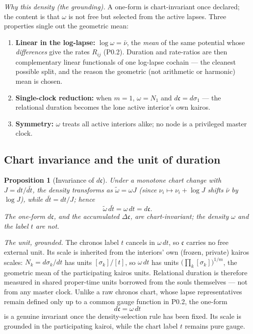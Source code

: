 \documentclass[11pt,a4paper]{article}
\theoremstyle{definition}
\theoremstyle{plain}
\newtheorem{proposition}[definition]{Proposition}
\theoremstyle{remark}
\begin{document}
\emph{Why this density (the grounding).} A one-form is chart-invariant once declared;
the content is that \(\omega\) is not free but selected from the active lapses. Three
properties single out the geometric mean:
\begin{enumerate}[label=\textup{(\arabic*)},leftmargin=1.45cm]
\item \textbf{Linear in the log-lapse:} \(\log\omega=\bar\nu\), the \emph{mean} of the
same potential whose \emph{differences} give the rates \(R_{ij}\) (P0.2). Duration and
rate-ratios are then complementary linear functionals of one log-lapse cochain ---
the cleanest possible split, and the reason the geometric (not arithmetic or harmonic)
mean is chosen.
\item \textbf{Single-clock reduction:} when \(m=1\), \(\omega=N_{1}\) and
\(d\mathfrak c=d\sigma_{1}\) --- the relational duration becomes the lone active
interior's own kairos.
\item \textbf{Symmetry:} \(\omega\) treats all active interiors alike; no node is a
privileged master clock.
\end{enumerate}

\subsection{Chart invariance and the unit of duration}

\begin{proposition}[Invariance of \(d\mathfrak c\)]
Under a monotone chart change with \(J=dt/d\widetilde t\), the density transforms as
\(\widetilde\omega=\omega J\) (since \(\nu_i\mapsto\nu_i+\log J\) shifts \(\bar\nu\) by
\(\log J\)), while \(d\widetilde t=dt/J\); hence
\[
\widetilde\omega\,d\widetilde t=\omega\,dt=d\mathfrak c .
\]
The one-form \(d\mathfrak c\), and the accumulated \(\Delta\mathfrak c\), are
chart-invariant; the density \(\omega\) and the label \(t\) are not.
\end{proposition}

\emph{The unit, grounded.} The chronos label \(t\) cancels in \(\omega\,dt\), so
\(\mathfrak c\) carries no free external unit. Its scale is inherited from the
interiors' own (frozen, private) kairos scales: \(N_k=d\sigma_k/dt\) has units
\([\sigma_k]/[t]\), so \(\omega\,dt\) has units \(\bigl(\prod_k[\sigma_k]\bigr)^{1/m}\),
the geometric mean of the participating kairos units. Relational duration is therefore
measured in shared proper-time units borrowed from the souls themselves --- not from
any master clock. Unlike a raw chronos chart, whose lapse representatives remain defined only up
to a common gauge function in P0.2, the one-form
\[
d\mathfrak c=\omega\,dt
\]
is a genuine invariant once the density-selection rule has been fixed. Its scale
is grounded in the participating kairoi, while the chart label \(t\) remains
pure gauge.
\end{document}
